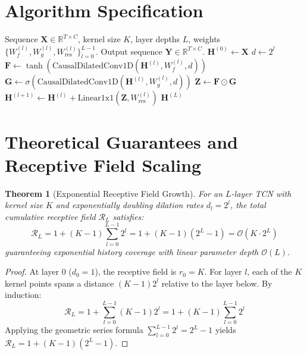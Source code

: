 \documentclass[11pt,a4paper]{article}
\newtheorem{theorem}{Theorem}
\theoremstyle{definition}
\begin{document}
\section{Algorithm Specification}

\begin{algorithm}[H]
\caption{TCN Causal Dilated Residual Forward Pass}
\label{alg:tcn}
\begin{algorithmic}[1]
\Require Sequence $\mathbf{X} \in \mathbb{R}^{T \times C}$, kernel size $K$, layer depths $L$, weights $\{W_f^{(l)}, W_g^{(l)}, W_{\text{res}}^{(l)}\}_{l=0}^{L-1}$.
\Ensure Output sequence $\mathbf{Y} \in \mathbb{R}^{T \times C}$.
\State $\mathbf{H}^{(0)} \gets \mathbf{X}$
    \State $d \gets 2^l$
    \State $\mathbf{F} \gets \tanh(\text{CausalDilatedConv1D}(\mathbf{H}^{(l)}, W_f^{(l)}, d))$
    \State $\mathbf{G} \gets \sigma(\text{CausalDilatedConv1D}(\mathbf{H}^{(l)}, W_g^{(l)}, d))$
    \State $\mathbf{Z} \gets \mathbf{F} \odot \mathbf{G}$
    \State $\mathbf{H}^{(l+1)} \gets \mathbf{H}^{(l)} + \text{Linear1x1}(\mathbf{Z}, W_{\text{res}}^{(l)})$
\EndFor
\State \Return $\mathbf{H}^{(L)}$
\end{algorithmic}
\end{algorithm}

\section{Theoretical Guarantees and Receptive Field Scaling}

\begin{theorem}[Exponential Receptive Field Growth]
\label{thm:tcn_rf}
For an $L$-layer TCN with kernel size $K$ and exponentially doubling dilation rates $d_l = 2^l$, the total cumulative receptive field $\mathcal{R}_L$ satisfies:
\begin{equation}
\mathcal{R}_L = 1 + (K - 1) \sum_{l=0}^{L-1} 2^l = 1 + (K - 1)(2^L - 1) = \mathcal{O}(K \cdot 2^L)
\end{equation}
guaranteeing exponential history coverage with linear parameter depth $\mathcal{O}(L)$.
\end{theorem}

\begin{proof}
At layer 0 ($d_0 = 1$), the receptive field is $r_0 = K$. For layer $l$, each of the $K$ kernel points spans a distance $(K - 1) 2^l$ relative to the layer below. By induction:
\begin{equation}
\mathcal{R}_L = 1 + \sum_{l=0}^{L-1} (K - 1) 2^l = 1 + (K - 1) \sum_{l=0}^{L-1} 2^l
\end{equation}
Applying the geometric series formula $\sum_{l=0}^{L-1} 2^l = 2^L - 1$ yields $\mathcal{R}_L = 1 + (K - 1)(2^L - 1)$.
\end{proof}
\end{document}
